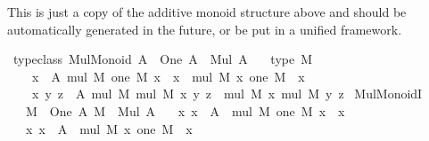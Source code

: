 \begin{isabellebody}
%
\isadelimproof
%
\endisadelimproof
%
\isadelimdocument
%
\endisadelimdocument
%
\isatagdocument
%
\isamarkuptrue%
%
\endisatagdocument
{\isafolddocument}%
%
\isadelimdocument
%
\endisadelimdocument
%
\begin{isamarkuptext}%
This is just a copy of the additive monoid structure above and should be
automatically generated in the future, or be put in a unified framework.%
\end{isamarkuptext}\isamarkuptrue%
\isamarkupfalse%
\ {\isacharbrackleft}{\kern0pt}typeclass{\isacharbrackright}{\kern0pt}{\isacharcolon}{\kern0pt}\ {\isachardoublequoteopen}Mul{\isacharunderscore}{\kern0pt}Monoid\ A\ {\isasymequiv}\ One\ A\ {\isacharampersand}{\kern0pt}\ Mul\ A\ {\isacharampersand}{\kern0pt}\isanewline
\ \ type\ {\isacharparenleft}{\kern0pt}{\isasymlambda}M{\isachardot}{\kern0pt}\isanewline
\ \ \ \ {\isacharparenleft}{\kern0pt}{\isasymforall}x\ {\isacharcolon}{\kern0pt}\ A{\isachardot}{\kern0pt}\ mul\ M\ {\isacharparenleft}{\kern0pt}one\ M{\isacharparenright}{\kern0pt}\ x\ {\isacharequal}{\kern0pt}\ x\ {\isasymand}\ mul\ M\ x\ {\isacharparenleft}{\kern0pt}one\ M{\isacharparenright}{\kern0pt}\ {\isacharequal}{\kern0pt}\ x{\isacharparenright}{\kern0pt}\ {\isasymand}\isanewline
\ \ \ \ {\isacharparenleft}{\kern0pt}{\isasymforall}x\ y\ z\ {\isacharcolon}{\kern0pt}\ A{\isachardot}{\kern0pt}\ mul\ M\ {\isacharparenleft}{\kern0pt}mul\ M\ x\ y{\isacharparenright}{\kern0pt}\ z\ {\isacharequal}{\kern0pt}\ mul\ M\ x\ {\isacharparenleft}{\kern0pt}mul\ M\ y\ z{\isacharparenright}{\kern0pt}{\isacharparenright}{\kern0pt}{\isacharparenright}{\kern0pt}{\isachardoublequoteclose}\isanewline
\isanewline
{}\isamarkupfalse%
\ Mul{\isacharunderscore}{\kern0pt}MonoidI{\isacharcolon}{\kern0pt}\isanewline
\ \ \ {\isachardoublequoteopen}M\ {\isacharcolon}{\kern0pt}\ One\ A{\isachardoublequoteclose}\ {\isachardoublequoteopen}M\ {\isacharcolon}{\kern0pt}\ Mul\ A{\isachardoublequoteclose}\isanewline
\ \ \ {\isachardoublequoteopen}{\isasymAnd}x{\isachardot}{\kern0pt}\ x\ {\isacharcolon}{\kern0pt}\ A\ {\isasymLongrightarrow}\ mul\ M\ {\isacharparenleft}{\kern0pt}one\ M{\isacharparenright}{\kern0pt}\ x\ {\isacharequal}{\kern0pt}\ x{\isachardoublequoteclose}\isanewline
\ \ \ {\isachardoublequoteopen}{\isasymAnd}x{\isachardot}{\kern0pt}\ x\ {\isacharcolon}{\kern0pt}\ A\ {\isasymLongrightarrow}\ mul\ M\ x\ {\isacharparenleft}{\kern0pt}one\ M{\isacharparenright}{\kern0pt}\ {\isacharequal}{\kern0pt}\ x{\isachardoublequoteclose}\isanewline

\end{isabellebody}
